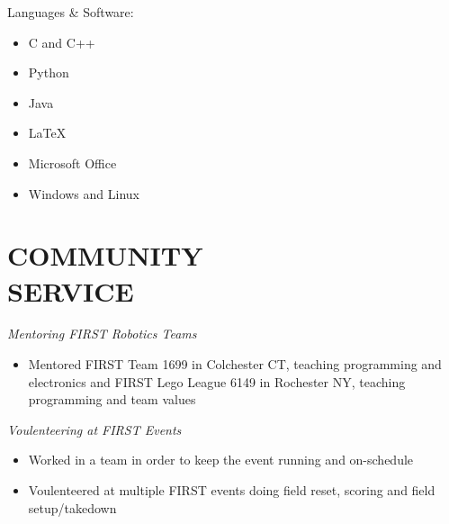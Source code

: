\documentclass[line,margin]{res}
\begin{document}
\begin{resume}
\begin{multicols}{2}
\begin{itemize}
			\end{itemize}
		\end{multicols}	
	\vspace{-8pt}
	{Languages \& Software:} %
		\begin{multicols}{2}
			\begin{itemize}
				\itemsep -2pt
				\item[] C and C++
				\item[] Python
				\item[] Java
				\item[] \LaTeX
				\item[] Microsoft Office
				\item[] Windows and Linux
			\end{itemize}
		\end{multicols}

\section{COMMUNITY \\ SERVICE}  

	{\sl Mentoring FIRST Robotics Teams}
	\begin{itemize}  
		\itemsep -2pt
		\item Mentored FIRST Team 1699 in Colchester CT, teaching programming and electronics and FIRST Lego League 6149 in Rochester NY, teaching programming and team values
	\end{itemize}

	\vspace{-8pt}
	{\sl Voulenteering at FIRST Events}
	\begin{itemize}
		\itemsep -2pt
		\item Worked in a team in order to keep the event running and on-schedule
		\item Voulenteered at multiple FIRST events doing field reset, scoring and field setup/takedown
	\end{itemize}


\end{resume}
\end{document}
